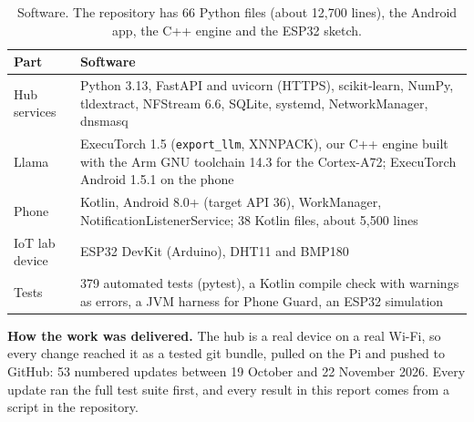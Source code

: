 \documentclass[11pt,a4paper]{article}
\newcommand{\code}[1]{\texttt{#1}}
\begin{document}
\begin{table}[H]
\centering\small
\begin{tabularx}{\textwidth}{@{}>{\raggedright\arraybackslash}p{3.1cm}X@{}}
\toprule
\textbf{Part} & \textbf{Software}\\
\midrule
Hub services & Python 3.13, FastAPI and uvicorn (HTTPS), scikit-learn, NumPy, tldextract, NFStream 6.6, SQLite, systemd, NetworkManager, dnsmasq\\
Llama & ExecuTorch 1.5 (\code{export\_llm}, XNNPACK), our C++ engine built with the Arm GNU toolchain 14.3 for the Cortex-A72; ExecuTorch Android 1.5.1 on the phone\\
Phone & Kotlin, Android 8.0+ (target API 36), WorkManager, NotificationListenerService; 38 Kotlin files, about 5,500 lines\\
IoT lab device & ESP32 DevKit (Arduino), DHT11 and BMP180\\
Tests & 379 automated tests (pytest), a Kotlin compile check with warnings as errors, a JVM harness for Phone Guard, an ESP32 simulation\\
\bottomrule
\end{tabularx}
\caption{Software. The repository has 66 Python files (about 12,700 lines), the Android app, the C++ engine and the ESP32 sketch.}
\end{table}

\textbf{How the work was delivered.} The hub is a real device on a real Wi-Fi, so every change reached it as a tested git
bundle, pulled on the Pi and pushed to GitHub: 53 numbered updates between 19 October and 22 November 2026. Every update
ran the full test suite first, and every result in this report comes from a script in the repository.
\end{document}
